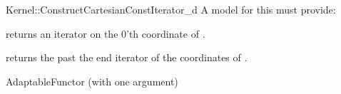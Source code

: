 \begin{ccRefFunctionObjectConcept}{Kernel::ConstructCartesianConstIterator_d}
A model for this must provide:



 {returns an iterator on the 0'th   coordinate of .}

 {returns the past the end iterator of the  coordinates of .}




\ccRefines
AdaptableFunctor (with one argument)


\ccSeeAlso
{} \\


\end{ccRefFunctionObjectConcept}

